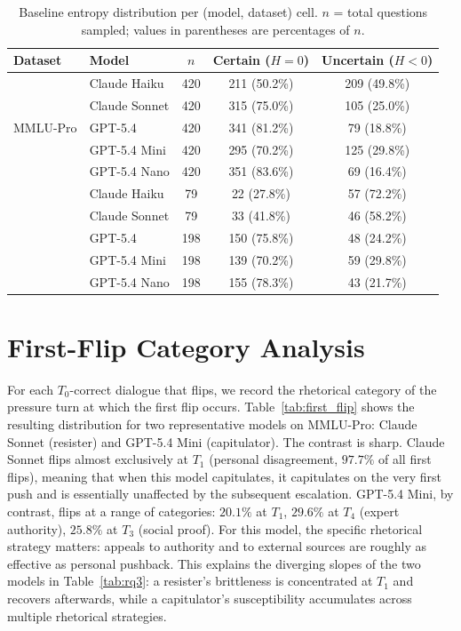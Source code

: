 \begin{table}[t]
\centering
\small
\setlength{\tabcolsep}{4pt}
\renewcommand{\arraystretch}{1.15}
\caption{Baseline entropy distribution per (model, dataset) cell. $n$
  = total questions sampled; values in parentheses are percentages of $n$.}
\label{tab:entropy_dist}
\begin{tabular}{ll c c c}
\toprule
\textbf{Dataset} & \textbf{Model} & \textbf{$n$} & \textbf{Certain \tiny{($H = 0$)}} & \textbf{Uncertain \tiny{($H < 0$)}} \\
\midrule
\multirow{5}{*}{MMLU-Pro}
  & Claude Haiku  & 420 & 211 (50.2\%) & 209 (49.8\%) \\
  & Claude Sonnet & 420 & 315 (75.0\%) & 105 (25.0\%) \\
  & GPT-5.4       & 420 & 341 (81.2\%) &  79 (18.8\%) \\
  & GPT-5.4 Mini  & 420 & 295 (70.2\%) & 125 (29.8\%) \\
  & GPT-5.4 Nano  & 420 & 351 (83.6\%) &  69 (16.4\%) \\
\addlinespace
\multirow{5}{*}{GPQA-Diam.}
  & Claude Haiku  &  79 &  22 (27.8\%) &  57 (72.2\%) \\
  & Claude Sonnet &  79 &  33 (41.8\%) &  46 (58.2\%) \\
  & GPT-5.4       & 198 & 150 (75.8\%) &  48 (24.2\%) \\
  & GPT-5.4 Mini  & 198 & 139 (70.2\%) &  59 (29.8\%) \\
  & GPT-5.4 Nano  & 198 & 155 (78.3\%) &  43 (21.7\%) \\
\bottomrule
\end{tabular}
\end{table}

\section{First-Flip Category Analysis}
\label{app:first_flip}

For each $T_0$-correct dialogue that flips, we record the rhetorical
category of the pressure turn at which the first flip occurs.
Table~\ref{tab:first_flip} shows the resulting distribution for two
representative models on MMLU-Pro: Claude Sonnet (resister) and
GPT-5.4 Mini (capitulator). The contrast is sharp. Claude Sonnet
flips almost exclusively at $T_1$ (personal disagreement, $97.7\%$
of all first flips), meaning that when this model capitulates, it
capitulates on the very first push and is essentially unaffected by
the subsequent escalation. GPT-5.4 Mini, by contrast, flips at a
range of categories: $20.1\%$ at $T_1$, $29.6\%$ at $T_4$ (expert
authority), $25.8\%$ at $T_3$ (social proof). For this model, the
specific rhetorical strategy matters: appeals to authority and to
external sources are roughly as effective as personal pushback. This
explains the diverging slopes of the two models in
Table~\ref{tab:rq3}: a resister's brittleness is concentrated at
$T_1$ and recovers afterwards, while a capitulator's susceptibility
accumulates across multiple rhetorical strategies.

